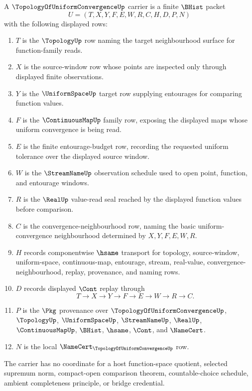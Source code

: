 \begin{definition}
\label{def:topology-of-uniform-convergence-packet}
A $\TopologyOfUniformConvergenceUp$ carrier is a finite $\BHist$ packet
$$
U=(T,X,Y,F,E,W,R,C,H,D,P,N)
$$
with the following displayed rows:
\begin{enumerate}
\item $T$ is the $\TopologyUp$ row naming the target neighbourhood surface for function-family reads.
\item $X$ is the source-window row whose points are inspected only through displayed finite observations.
\item $Y$ is the $\UniformSpaceUp$ target row supplying entourages for comparing function values.
\item $F$ is the $\ContinuousMapUp$ family row, exposing the displayed maps whose uniform convergence is being read.
\item $E$ is the finite entourage-budget row, recording the requested uniform tolerance over the displayed source window.
\item $W$ is the $\StreamNameUp$ observation schedule used to open point, function, and entourage windows.
\item $R$ is the $\RealUp$ value-read seal reached by the displayed function values before comparison.
\item $C$ is the convergence-neighbourhood row, naming the basic uniform-convergence neighbourhood determined by $X,Y,F,E,W,R$.
\item $H$ records componentwise $\hsame$ transport for topology, source-window, uniform-space, continuous-map, entourage, stream, real-value, convergence-neighbourhood, replay, provenance, and naming rows.
\item $D$ records displayed $\Cont$ replay through
$$
T\longrightarrow X\longrightarrow Y\longrightarrow F\longrightarrow E\longrightarrow W\longrightarrow R\longrightarrow C .
$$
\item $P$ is the $\Pkg$ provenance over $\TopologyOfUniformConvergenceUp$, $\TopologyUp$, $\UniformSpaceUp$, $\StreamNameUp$, $\RealUp$, $\ContinuousMapUp$, $\BHist$, $\hsame$, $\Cont$, and $\NameCert$.
\item $N$ is the local $\NameCert_{\TopologyOfUniformConvergenceUp}$ row.
\end{enumerate}
The carrier has no coordinate for a host function-space quotient, selected supremum norm, compact-open comparison theorem, countable-choice schedule, ambient completeness principle, or bridge credential.
\end{definition}

